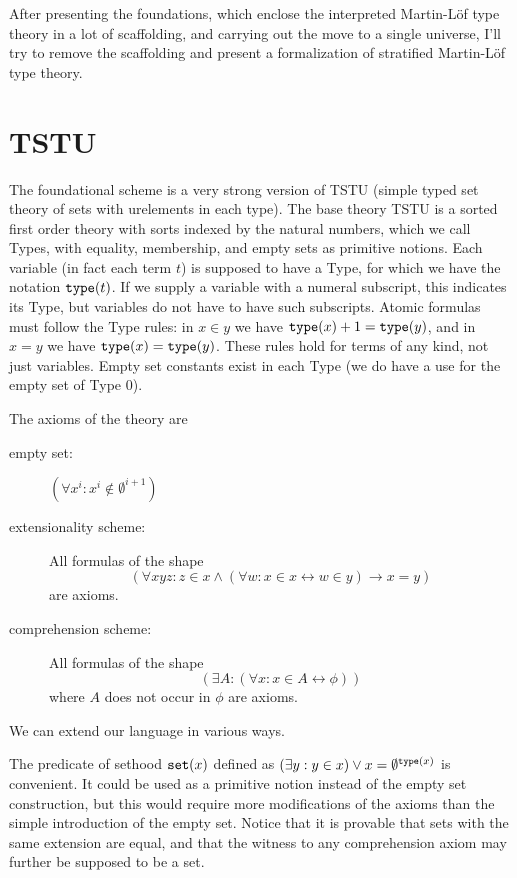 \documentclass[12pt]{article}
\begin{document}
After presenting the foundations, which enclose the interpreted Martin-L\"of type theory in a lot of scaffolding,
and carrying out the move to a single universe, I'll try to remove the scaffolding and present a formalization of 
stratified Martin-L\"of type theory.

\section{TSTU}

The foundational scheme is a very strong version of TSTU (simple typed set theory of sets with urelements in each type).
The base theory TSTU is a sorted first order theory with sorts indexed by the natural numbers, which we call Types, with equality, membership, and empty sets as primitive notions.  Each variable (in fact each term $t$) is supposed to have a Type, for which we have the notation ${\tt type}(t)$.  If we supply a variable with a numeral subscript, this indicates its Type, but variables do not have to have such subscripts.  Atomic formulas must follow
the Type rules:  in $x \in y$ we have ${\tt type}(x)+1 = {\tt type}(y)$, and in $x=y$ we have ${\tt type}(x)={\tt type}(y)$.  These rules hold for terms of any kind, not just variables.
Empty set constants exist in each Type (we do have a use for the empty set of Type 0).

The axioms of the theory are

\begin{description}

\item[empty set:]  $(\forall x^i:x^i \not\in \emptyset^{i+1})$

\item[extensionality scheme:]  All formulas of the shape $$(\forall xyz:z \in x \wedge (\forall w:x \in x \leftrightarrow w \in y) \rightarrow x=y)$$ are axioms.

\item[comprehension scheme:]  All formulas of the shape $$(\exists A:(\forall x:x \in A \leftrightarrow \phi))$$ where $A$ does not occur in $\phi$ are axioms.

\end{description}

We can extend our language in various ways.  

The predicate of sethood ${\tt set}(x)$ defined as $(\exists y:y \in x) \vee x = \emptyset^{{\tt type}(x)}$ is convenient.  It could be used as a primitive notion instead of the
empty set construction, but this would require more modifications of the axioms than the simple introduction of the empty set.  Notice that it is provable that sets with the same extension are equal,
and that the witness to any comprehension axiom may further be supposed to be a set.
\end{document}

